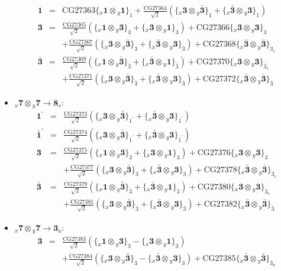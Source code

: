 \documentclass[english]{article}
\newcommand{\rep}[1]{\mathbf{#1}}
\newcommand{\repx}[2]{{}_{#2}\mathbf{#1}}
\newcommand{\subcg}[3]{\big\{ \repx{#1}{x}\otimes\repx{#2}{y}\big\}^{}_{#3}}
\begin{document}
\begin{itemize}
\begin{eqnarray*}
\rep{1} &=& \text{CG27363}\subcg{1}{1}{1}+\frac{\text{CG27364}}{\sqrt{2}}\left(\subcg{3}{\bar{3}}{1}+\subcg{\bar{3}}{3}{1}\right)
\\
\rep{3} &=& \frac{\text{CG27365}}{\sqrt{2}}\left(\subcg{1}{3}{3}+\subcg{3}{1}{3}\right)+\text{CG27366}\subcg{3}{3}{3} \\ 
 & & +\frac{\text{CG27367}}{\sqrt{2}}\left(\subcg{3}{\bar{3}}{3}+\subcg{\bar{3}}{3}{3}\right)+\text{CG27368}\subcg{\bar{3}}{\bar{3}}{3_{s}}
\\
\rep{\bar{3}} &=& \frac{\text{CG27369}}{\sqrt{2}}\left(\subcg{1}{\bar{3}}{\bar{3}}+\subcg{\bar{3}}{1}{\bar{3}}\right)+\text{CG27370}\subcg{3}{3}{\bar{3}_{s}} \\ 
 & & +\frac{\text{CG27371}}{\sqrt{2}}\left(\subcg{3}{\bar{3}}{\bar{3}}+\subcg{\bar{3}}{3}{\bar{3}}\right)+\text{CG27372}\subcg{\bar{3}}{\bar{3}}{\bar{3}}
\end{eqnarray*}
\item $\repx{7}{x}\otimes\repx{7}{y}\to\rep{8}_{s}$:
\begin{eqnarray*}
\rep{1^{\prime}} &=& \frac{\text{CG27373}}{\sqrt{2}}\left(\subcg{3}{\bar{3}}{1^{\prime}}+\subcg{\bar{3}}{3}{1^{\prime}}\right)
\\
\rep{\bar{1}^{\prime}} &=& \frac{\text{CG27374}}{\sqrt{2}}\left(\subcg{3}{\bar{3}}{\bar{1}^{\prime}}+\subcg{\bar{3}}{3}{\bar{1}^{\prime}}\right)
\\
\rep{3} &=& \frac{\text{CG27375}}{\sqrt{2}}\left(\subcg{1}{3}{3}+\subcg{3}{1}{3}\right)+\text{CG27376}\subcg{3}{3}{3} \\ 
 & & +\frac{\text{CG27377}}{\sqrt{2}}\left(\subcg{3}{\bar{3}}{3}+\subcg{\bar{3}}{3}{3}\right)+\text{CG27378}\subcg{\bar{3}}{\bar{3}}{3_{s}}
\\
\rep{\bar{3}} &=& \frac{\text{CG27379}}{\sqrt{2}}\left(\subcg{1}{\bar{3}}{\bar{3}}+\subcg{\bar{3}}{1}{\bar{3}}\right)+\text{CG27380}\subcg{3}{3}{\bar{3}_{s}} \\ 
 & & +\frac{\text{CG27381}}{\sqrt{2}}\left(\subcg{3}{\bar{3}}{\bar{3}}+\subcg{\bar{3}}{3}{\bar{3}}\right)+\text{CG27382}\subcg{\bar{3}}{\bar{3}}{\bar{3}}
\end{eqnarray*}
\item $\repx{7}{x}\otimes\repx{7}{y}\to\rep{3}_{a}$:
\begin{eqnarray*}
\rep{3} &=& \frac{\text{CG27383}}{\sqrt{2}}\left(\subcg{1}{3}{3}-\subcg{3}{1}{3}\right) \\ 
 & & +\frac{\text{CG27384}}{\sqrt{2}}\left(\subcg{3}{\bar{3}}{3}-\subcg{\bar{3}}{3}{3}\right)+\text{CG27385}\subcg{\bar{3}}{\bar{3}}{3_{a}}

\end{eqnarray*}
\end{itemize}
\end{document}
